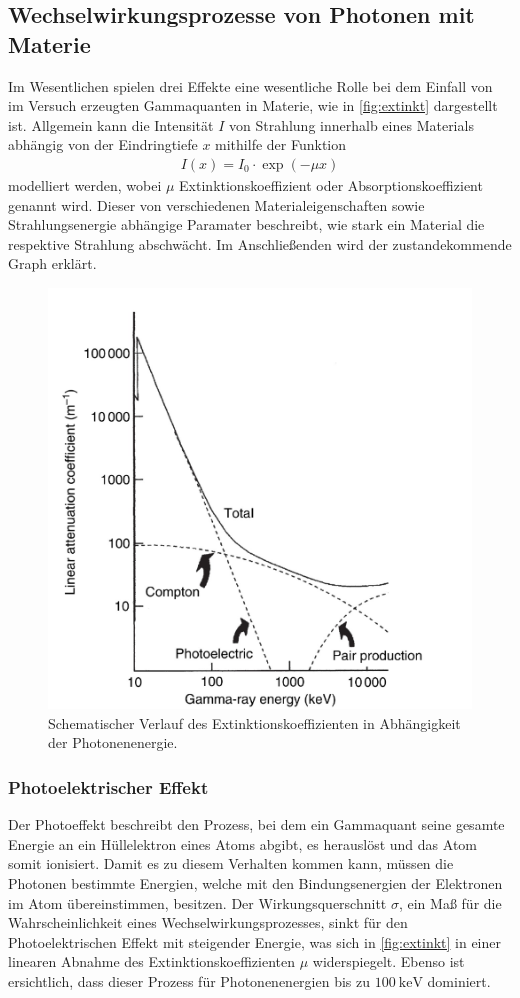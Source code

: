\documentclass[12pt]{article}
\begin{document}
\subsection{Wechselwirkungsprozesse von Photonen mit Materie}
Im Wesentlichen spielen drei Effekte eine wesentliche Rolle bei dem Einfall von im Versuch erzeugten Gammaquanten in Materie, wie in \autoref{fig:extinkt} dargestellt ist.
Allgemein kann die Intensität $I$ von Strahlung innerhalb eines Materials abhängig von der Eindringtiefe $x$ mithilfe der Funktion
\begin{align}
  I(x) = I_0\cdot\exp{(-\mu x)}
\end{align}
modelliert werden, wobei $\mu$ Extinktionskoeffizient oder Absorptionskoeffizient genannt wird. Dieser von verschiedenen Materialeigenschaften sowie Strahlungsenergie abhängige Paramater beschreibt, wie stark ein Material die respektive Strahlung abschwächt.
Im Anschließenden wird der zustandekommende Graph erklärt.
\begin{figure}[H]
  \centering
  \includegraphics[scale=0.65]{Ressourcen/extinkt.png}
  \caption{Schematischer Verlauf des Extinktionskoeffizienten in Abhängigkeit der Photonenenergie\cite{gilmore}.}
  \label{fig:extinkt}
\end{figure}
\subsubsection{Photoelektrischer Effekt}
Der Photoeffekt beschreibt den Prozess, bei dem ein Gammaquant seine gesamte Energie an ein Hüllelektron eines Atoms abgibt, es herauslöst und das Atom somit ionisiert. Damit es zu diesem Verhalten kommen kann, müssen die Photonen bestimmte Energien, welche mit den Bindungsenergien der Elektronen im Atom übereinstimmen, besitzen.
Der Wirkungsquerschnitt $\sigma$, ein Maß für die Wahrscheinlichkeit eines Wechselwirkungsprozesses, sinkt für den Photoelektrischen Effekt mit steigender Energie, was sich in \autoref{fig:extinkt} in einer linearen Abnahme des Extinktionskoeffizienten $\mu$ widerspiegelt.
Ebenso ist ersichtlich, dass dieser Prozess für Photonenenergien bis zu $\SI{100}{\kilo\electronvolt}$ dominiert.
\end{document}
